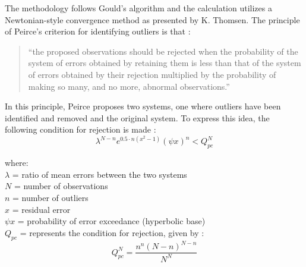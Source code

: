 The methodology follows Gould's algorithm and the calculation utilizes a Newtonian-style convergence method as presented by K. Thomsen\footnotemark.  
The principle of Peirce's criterion for identifying outliers is that \parencite{peirce52}:
\begin{quotation}
``the proposed observations should be rejected when the probability of the system of errors obtained by retaining them is less than that of the system of errors obtained by their rejection multiplied by the probability of making so many, and no more, abnormal observations.''
\end{quotation}

In this principle, Peirce proposes two systems, one where outliers have been identified and removed and the original system.  
To express this idea, the following condition for rejection is made \parencite[Eq. A]{gould55}:
%
%
%
%
%
\begin{equation}
\label{eq:goulda}
    \lambda^{N-n} e^{0.5\cdot n(x^{2}-1)}(\psi x)^{n} < Q_{pc}^{N}
\end{equation}

\noindent where: \\
\indent $\lambda$ = ratio of mean errors between the two systems \\
\indent $N$ = number of observations \\
\indent $n$ = number of outliers \\
\indent $x$ = residual error \\
\indent $\psi x$ = probability of error exceedance (hyperbolic base) \\
\indent $Q_{pc}$ = represents the condition for rejection, given by 
\parencite[Eq. B]{gould55}:
\begin{equation}
\label{eq:gouldb}
    Q_{pc}^{N} = \frac{n^{n}(N-n)^{N-n}}{N^{N}}
\end{equation}

